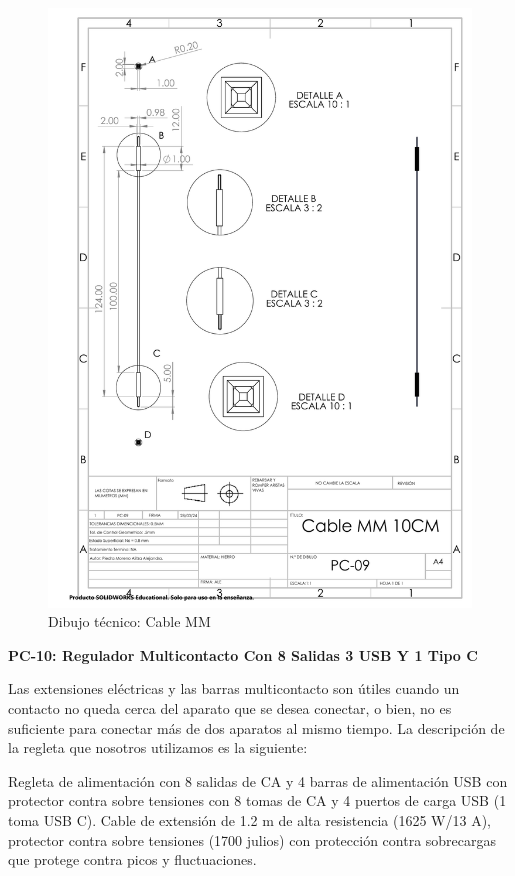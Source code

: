     \begin{figure}[H]
        \centering
        \includegraphics[trim = {21mm 70mm 137mm 17mm},clip,scale=0.4, angle=270]{22/Img/cableMMDibujo.PDF}
        \caption{Dibujo técnico: Cable MM}
        \label{fig:Cable MM}
    \end{figure}
    
    \textbf{PC-10: Regulador Multicontacto Con 8 Salidas 3 USB Y 1 Tipo C }
    
    Las extensiones eléctricas y las barras multicontacto son útiles cuando un contacto no queda cerca del aparato que se desea conectar, o bien, no es suficiente para conectar más de dos aparatos al mismo tiempo.
    La descripción de la regleta que nosotros utilizamos es la siguiente:
    
    Regleta de alimentación con 8 salidas de CA y 4 barras de alimentación USB con protector contra sobre tensiones con 8 tomas de CA y 4 puertos de carga USB (1 toma USB C). Cable de extensión de 1.2 m de alta resistencia (1625 W/13 A), protector contra sobre tensiones (1700 julios) con protección contra sobrecargas que protege contra picos y fluctuaciones.
    
